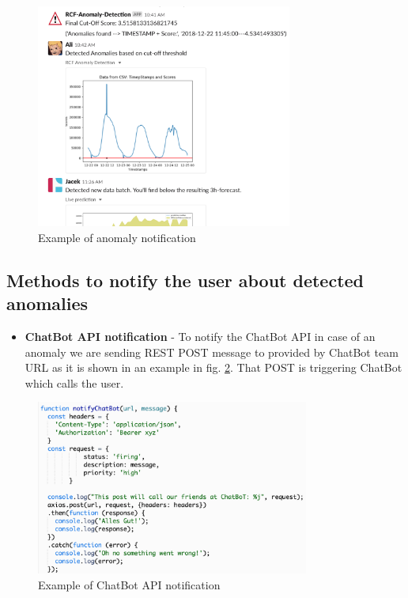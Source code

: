 \begin{figure}[h!]
    \centering
    \includegraphics[width=0.75\textwidth]{images/UserNotification.png}
    \caption{Example of anomaly notification}
    \label{fig:userNotif}
\end{figure}

\subsection{Methods to notify the user about detected anomalies}
\begin{itemize}
\item \textbf{ChatBot API notification} - To notify the ChatBot API in case of an anomaly we are sending REST POST message to provided by ChatBot team URL as it is shown in an example in fig. \ref{fig:chatbot}. That POST is triggering ChatBot which calls the user.
\end{itemize}

\begin{figure}[h!]
    \centering
    \includegraphics[width=0.8\textwidth]{images/chatbot-api-notif.png}
    \caption{Example of ChatBot API notification}
    \label{fig:chatbot}
\end{figure}


